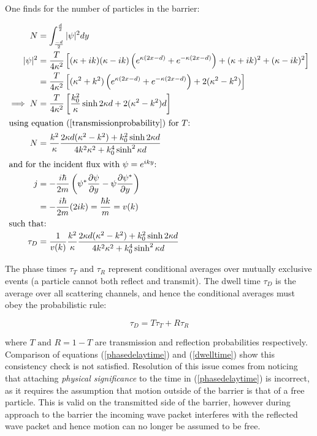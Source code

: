 \documentclass{article}
\begin{document}
\noindent One finds for the number of particles in the barrier:

\begin{align}
	N&=\int_{\frac{-d}{2}}^{\frac{d}{2}}|\psi|^2dy \\
	|\psi|^2 &= \frac{T}{4\kappa^2}\left[(\kappa+ik)(\kappa-ik)\left(e^{\kappa(2x-d)}+e^{-\kappa(2x-d)}\right)+(\kappa+ik)^2+(\kappa-ik)^2\right] \\
		 &= \frac{T}{4\kappa^2}\left[(\kappa^2+k^2)\left(e^{\kappa(2x-d)}+e^{-\kappa(2x-d)}\right)+2(\kappa^2-k^2)\right] \\
	\implies N &= \frac{T}{4\kappa^2}\left[\frac{k_0^2}{\kappa}\sinh{2\kappa d}+2(\kappa^2-k^2)d\right] \\ \intertext{using equation (\ref{transmissionprobability}) for $T$:}
		 N &= \frac{k^2}{\kappa}\frac{2\kappa d(\kappa^2-k^2)+k_0^2\sinh{2\kappa d}}{4k^2\kappa^2+k_0^4\sinh^2{\kappa d}}\\ \intertext{and for the incident flux with $\psi = e^{iky}$:
}
j &= -\frac{i\hbar}{2m}\left(\psi^{*}\frac{\partial\psi}{\partial y}-\psi \frac{\partial \psi^{*}}{\partial y}\right) \label{1dflux}\\ 
	  &= -\frac{i\hbar}{2m}(2ik) = \frac{\hbar k}{m} = v(k) \\ \intertext{such that:}
	\tau_D &= \frac{1}{v(k)}\frac{k^2}{\kappa}\frac{2\kappa d(\kappa^2-k^2)+k_0^2\sinh{2\kappa d}}{4k^2\kappa^2+k_0^4\sinh^2{\kappa d}}
	\label{dwelltime}
\end{align}

\noindent The phase times $\tau_T \text{ and } \tau_R$ represent conditional averages over mutually exclusive events (a particle cannot both reflect and transmit). The dwell time $\tau_D$ is the average over all scattering channels, and hence the conditional averages must obey the probabilistic rule:

\begin{equation}
	\tau_D = T\tau_T+R\tau_R
	\label{dwellcondition}
\end{equation}

\noindent where $T \text{ and } R = 1-T$ are transmission and reflection probabilities respectively. Comparison of equations (\ref{phasedelaytime}) and (\ref{dwelltime}) show this consistency check is not satisfied. Resolution of this issue comes from noticing that attaching \textit{physical significance} to the time in (\ref{phasedelaytime}) is incorrect, as it requires the assumption that motion outside of the barrier is that of a free particle. This is valid on the transmitted side of the barrier, however during approach to the barrier the incoming wave packet interferes with the reflected wave packet and hence motion can no longer be assumed to be free.
\end{document}
